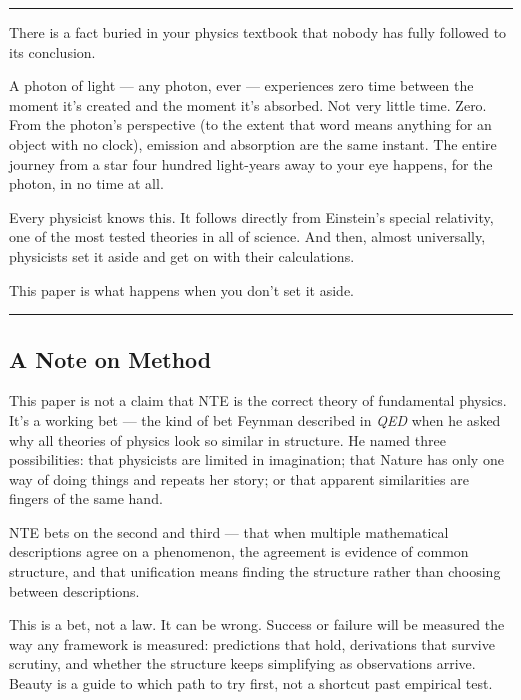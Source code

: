 \documentclass[
  11pt,
]{article}
\begin{document}
\begin{center}\rule{0.5\linewidth}{0.5pt}\end{center}

There is a fact buried in your physics textbook that nobody has fully
followed to its conclusion.

A photon of light --- any photon, ever --- experiences zero time between
the moment it's created and the moment it's absorbed. Not very little
time. Zero. From the photon's perspective (to the extent that word means
anything for an object with no clock), emission and absorption are the
same instant. The entire journey from a star four hundred light-years
away to your eye happens, for the photon, in no time at all.

Every physicist knows this. It follows directly from Einstein's special
relativity, one of the most tested theories in all of science. And then,
almost universally, physicists set it aside and get on with their
calculations.

This paper is what happens when you don't set it aside.

\begin{center}\rule{0.5\linewidth}{0.5pt}\end{center}

\subsection{A Note on Method}\label{a-note-on-method}

This paper is not a claim that NTE is the correct theory of fundamental
physics. It's a working bet --- the kind of bet Feynman described in
\emph{QED} when he asked why all theories of physics look so similar in
structure. He named three possibilities: that physicists are limited in
imagination; that Nature has only one way of doing things and repeats
her story; or that apparent similarities are fingers of the same hand.

NTE bets on the second and third --- that when multiple mathematical
descriptions agree on a phenomenon, the agreement is evidence of common
structure, and that unification means finding the structure rather than
choosing between descriptions.

This is a bet, not a law. It can be wrong. Success or failure will be
measured the way any framework is measured: predictions that hold,
derivations that survive scrutiny, and whether the structure keeps
simplifying as observations arrive. Beauty is a guide to which path to
try first, not a shortcut past empirical test.
\end{document}
